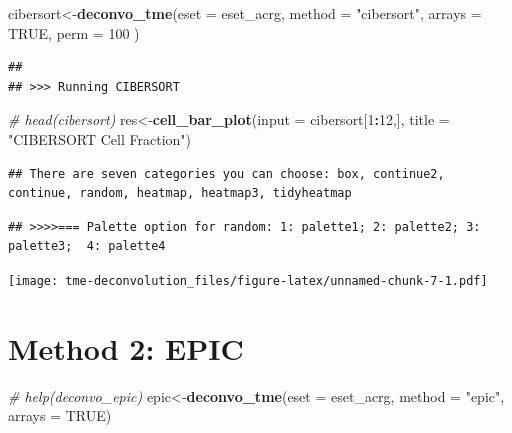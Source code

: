 \documentclass[
  12pt,
]{book}
\newenvironment{Shaded}{\begin{snugshade}}{\end{snugshade}}
\newcommand{\AttributeTok}[1]{\textcolor[rgb]{0.13,0.29,0.53}{#1}}
\newcommand{\CommentTok}[1]{\textcolor[rgb]{0.56,0.35,0.01}{\textit{#1}}}
\newcommand{\ConstantTok}[1]{\textcolor[rgb]{0.56,0.35,0.01}{#1}}
\newcommand{\DecValTok}[1]{\textcolor[rgb]{0.00,0.00,0.81}{#1}}
\newcommand{\FunctionTok}[1]{\textcolor[rgb]{0.13,0.29,0.53}{\textbf{#1}}}
\newcommand{\NormalTok}[1]{#1}
\newcommand{\OtherTok}[1]{\textcolor[rgb]{0.56,0.35,0.01}{#1}}
\newcommand{\SpecialCharTok}[1]{\textcolor[rgb]{0.81,0.36,0.00}{\textbf{#1}}}
\newcommand{\StringTok}[1]{\textcolor[rgb]{0.31,0.60,0.02}{#1}}
\begin{document}
\begin{Shaded}
\begin{Highlighting}[]
\NormalTok{cibersort}\OtherTok{\textless{}{-}}\FunctionTok{deconvo\_tme}\NormalTok{(}\AttributeTok{eset =}\NormalTok{ eset\_acrg, }\AttributeTok{method =} \StringTok{"cibersort"}\NormalTok{, }\AttributeTok{arrays =} \ConstantTok{TRUE}\NormalTok{, }\AttributeTok{perm =} \DecValTok{100}\NormalTok{ )}
\end{Highlighting}
\end{Shaded}

\begin{verbatim}
## 
## >>> Running CIBERSORT
\end{verbatim}

\begin{Shaded}
\begin{Highlighting}[]
\CommentTok{\# head(cibersort)}
\NormalTok{res}\OtherTok{\textless{}{-}}\FunctionTok{cell\_bar\_plot}\NormalTok{(}\AttributeTok{input =}\NormalTok{ cibersort[}\DecValTok{1}\SpecialCharTok{:}\DecValTok{12}\NormalTok{,], }\AttributeTok{title =} \StringTok{"CIBERSORT Cell Fraction"}\NormalTok{)}
\end{Highlighting}
\end{Shaded}

\begin{verbatim}
## There are seven categories you can choose: box, continue2, continue, random, heatmap, heatmap3, tidyheatmap
\end{verbatim}

\begin{verbatim}
## >>>>=== Palette option for random: 1: palette1; 2: palette2; 3: palette3;  4: palette4
\end{verbatim}

\texttt{[image: tme-deconvolution\_files/figure-latex/unnamed-chunk-7-1.pdf]}

\hypertarget{method-2-epic}{%
\section{Method 2: EPIC}\label{method-2-epic}}

\begin{Shaded}
\begin{Highlighting}[]
\CommentTok{\# help(deconvo\_epic)}
\NormalTok{epic}\OtherTok{\textless{}{-}}\FunctionTok{deconvo\_tme}\NormalTok{(}\AttributeTok{eset =}\NormalTok{ eset\_acrg, }\AttributeTok{method =} \StringTok{"epic"}\NormalTok{, }\AttributeTok{arrays =} \ConstantTok{TRUE}\NormalTok{)}
\end{Highlighting}
\end{Shaded}
\end{document}
